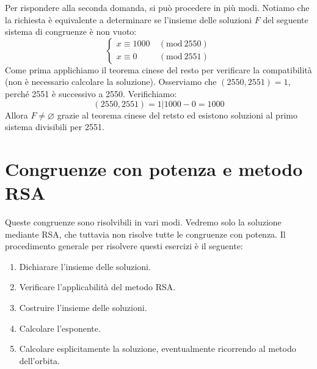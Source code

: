 \documentclass[oneside]{book}
\theoremstyle{remark}
\newcommand{\Mod}[1]{\ (\mathrm{mod}\ #1)} %
\begin{document}
\begin{tcolorbox}[enhanced, breakable, colback=blue!30, colframe=blue!30!black, title=Esempio]
Per rispondere alla seconda domanda, si può procedere in più modi. Notiamo
che la richiesta è equivalente a determinare se l'insieme delle soluzioni
$F$ del seguente sistema di congruenze è non vuoto:
\[
\begin{cases}
    x\equiv 1000 &\Mod{2550}\\
    x\equiv 0    &\Mod{2551}
\end{cases}
\]
Come prima applichiamo il teorema cinese del resto per verificare la
compatibilità (non è necessario calcolare la soluzione). Osserviamo
che $(2550,2551)=1$, perché 2551 è successivo a 2550. Verifichiamo:
\[ (2550,2551)=1|1000-0=1000 \]
Allora $F\not=\varnothing$ grazie al teorema cinese del
retsto ed esistono soluzioni al primo sistema divisibili
per 2551.
\end{tcolorbox}


\newpage
\section{Congruenze con potenza e metodo RSA}
Queste congruenze sono risolvibili in vari modi. Vedremo solo la soluzione
mediante RSA, che tuttavia non risolve tutte le congruenze con potenza. Il
procedimento generale per risolvere questi esercizi è il seguente:
\begin{enumerate}
\item Dichiarare l'insieme delle soluzioni.
\item Verificare l'applicabilità del metodo RSA.
\item Costruire l'insieme delle soluzioni.
\item Calcolare l'esponente.
\item Calcolare esplicitamente la soluzione, eventualmente ricorrendo
al metodo dell'orbita.
\end{enumerate}
\end{document}
